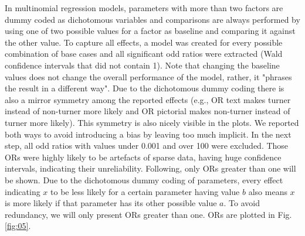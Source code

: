 \documentclass{frontiersSCNS} %
\begin{document}
In multinomial regression models, parameters with more than two factors are dummy coded as dichotomous variables and comparisons are always performed by using one of two possible values for a factor as baseline and comparing it against the other value. To capture all effects, a model was created for every possible combination of base cases and all significant odd ratios were extracted (Wald confidence intervals that did not contain 1). Note that changing the baseline values does not change the overall performance of the model, rather, it "phrases the result in a different way". 
Due to the dichotomous dummy coding there is also a mirror symmetry among the reported effects (e.g., OR text makes turner instead of non-turner more likely and OR pictorial makes non-turner instead of turner more likely). This symmetry is also nicely visible in the plots. We reported both ways to avoid introducing a bias by leaving too much implicit.
In the next step, all odd ratios with values under 0.001 and over 100 were excluded. Those ORs were highly likely to be artefacts of sparse data, having huge confidence intervals, indicating their unreliability. 
Following, only ORs greater than one will be shown. Due to the dichotomous dummy coding of parameters, every effect indicating $x$ to be less likely for a certain parameter having value $b$ also means $x$ is more likely if that parameter has its other possible value $a$. To avoid redundancy, we will only present ORs greater than one. ORs are plotted in Fig. \ref{fig:05}.
\end{document}
